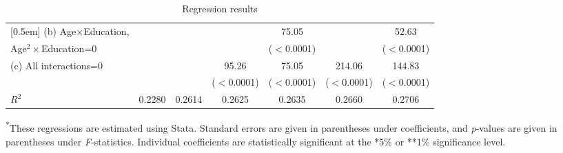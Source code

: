 \begin{table}[htbp]
\begin{adjustwidth}{-0.6in}{-0.5in}
\begin{tabular}{l*{6}{c}}
[0.5em]
(b) Age$\times$Education,&           &              &              &         75.05&              &         52.63\\
  Age$^2\times$Education=0&          &              &              &   ($<$0.0001)&              &   ($<$0.0001)\\
[0.5em]
(c) All interactions=0&              &              &         95.26&         75.05&        214.06&        144.83\\
                      &              &              &   ($<$0.0001)&   ($<$0.0001)&   ($<$0.0001)&   ($<$0.0001)\\
[0.5em]
$R^2$                 &        0.2280&        0.2614&        0.2625&        0.2635&        0.2660&        0.2706\\
\hline\hline
\end{tabular}
\begin{tablenotes}\footnotesize
\item \textsuperscript{*}These regressions are estimated using Stata. Standard errors are given in parentheses under coefficients, and \textit{p}-values are given in parentheses under \textit{F}-statistics. Individual coefficients are statistically significant at the *5\% or **1\% significance level.
\end{tablenotes}
\end{adjustwidth}
\caption{Regression results\label{tab:regression}}
\end{table}
